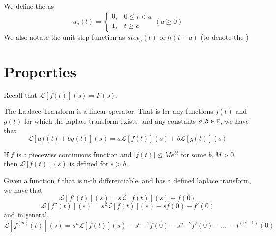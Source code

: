 \begin{definition}
        We define the  as \begin{equation}
                u_a(t) = \left\{\begin{array}{cc} 0, & 0\leq t < a \\ 1, & t \geq a \end{array}\right. (a \geq 0)
        \end{equation}
        We also notate the unit step function as $step_a(t)$ or $h(t-a)$ (to denote the )
\end{definition}


\section{Properties}

Recall that $\mathcal{L}[f(t)](s) = F(s)$.

\begin{props}[Linearity]
        The Laplace Transform is a linear operator. That is for any functions $f(t)$ and $g(t)$ for which the laplace transform exists, and any constants $a,b \in \mathbb R$, we have that \begin{equation}
                \mathcal{L}[af(t)+bg(t)](s)=a\mathcal{L}[f(t)](s)+b\mathcal{L}[g(t)](s)
        \end{equation}
\end{props}




\begin{props}[Defined]
        If $f$ is a piecewise continuous function and $|f(t)| \leq Me^{bt}$ for some $b,M > 0$, then $\mathcal{L}[f(t)](s)$ is defined for $s > b$.
\end{props}




\begin{props}
        Given a function $f$ that is n-th differentiable, and has a defined laplace transform, we have that \begin{equation}
                \mathcal{L}[f'(t)](s) = s\mathcal{L}[f(t)](s) - f(0) 
        \end{equation}
        \begin{equation}
                \mathcal{L}[f''(t)](s) = s^2\mathcal{L}[f(t)](s) - sf(0) - f'(0)
        \end{equation}
        and in general,  \begin{equation}
                \mathcal{L}[f^{(n)}(t)](s) = s^n\mathcal{L}[f(t)](s) - s^{n-1}f(0) - s^{n-2}f'(0) - ... - f^{(n-1)}(0) 
        \end{equation}
\end{props}


